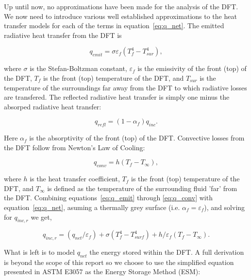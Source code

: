 \documentclass[article]{proc}
\begin{document}
    Up until now, no approximations have been made for the analysis of the DFT. We now need to introduce various well established approximations to the heat transfer models for each of the terms in equation~\ref{eq:q_net}. The emitted radiative heat transfer from the DFT is

    \begin{equation}\label{eq:q_emit}
        q_{emit} = \sigma \varepsilon_f (T_f^4 - T_{sur}^4),
    \end{equation}

    \noindent where $\sigma$ is the Stefan-Boltzman constant, $\varepsilon_f$ is the emissivity of the front (top) of the DFT, $T_f$ is the front (top) temperature of the DFT, and $T_{sur}$ is the temperature of the surroundings far away from the DFT to which radiative losses are transfered. The reflected radiative heat transfer is simply one minus the absorped radiative heat transfer:

    \begin{equation}\label{eq:q_refl}
        q_{refl} = (1 - \alpha_f)q_{inc}.
    \end{equation}

    \noindent Here $\alpha_f$ is the absorptivity of the front (top) of the DFT. Convective losses from the DFT follow from Newton's Law of Cooling:

    \begin{equation}\label{eq:q_conv}
        q_{conv} = h (T_f - T_{\infty}),
    \end{equation}

    \noindent where $h$ is the heat transfer coefficient, $T_f$ is the front (top) temperature of the DFT, and $T_{\infty}$ is defined as the temperature of the surrounding fluid 'far' from the DFT. Combining equations~\ref{eq:q_emit} through \ref{eq:q_conv} with equation~\ref{eq:q_net}, asuming a thermally grey surface (i.e. $\alpha_f = \varepsilon_f$), and solving for $q_{inc,r}$ we get,

    \begin{equation}\label{eq:q_inc}
        q_{inc,r} = (q_{net}/\varepsilon_f) + \sigma (T_f^4 - T_{surf}^4) + h/\varepsilon_f (T_f - T_{\infty}).
    \end{equation}

    What is left is to model $q_{net}$ the energy stored within the DFT. A full derivation is beyond the scope of this report so we choose to use the simplified equation presented in ASTM E3057 as the Energy Storage Method (ESM):
\end{document}

